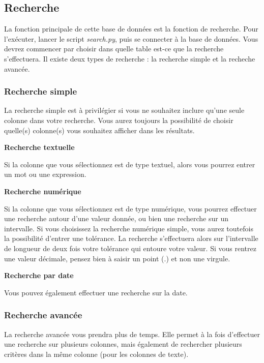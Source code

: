 \documentclass[12pt,a4paper]{article}
\begin{document}
\bigskip
\subsection{Recherche}

    La fonction principale de cette base de données est la fonction de recherche.
    Pour l'exécuter, lancer le script \emph{search.py}, puis se connecter à la base de données.
    Vous devrez commencer par choisir dans quelle table est-ce que la recherche s'effectuera.
    Il existe deux types de recherche : la recherche simple et la recheche avancée.

    \subsubsection{Recherche simple}
        La recherche simple est à privilégier si vous ne souhaitez inclure qu'une seule colonne dans votre recherche.
        Vous aurez toujours la possibilité de choisir quelle(s) colonne(s) vous souhaitez afficher dans les résultats.


        \medskip
        \textbf{Recherche textuelle}

        Si la colonne que vous sélectionnez est de type textuel, alors vous pourrez entrer un mot ou une expression.
        
        \medskip
        \textbf{Recherche numérique}
        
        Si la colonne que vous sélectionnez est de type numérique, vous pourrez effectuer une recherche autour d'une valeur donnée,
        ou bien une recherche sur un intervalle. Si vous choisissez la recherche numérique simple, vous aurez toutefois
        la possibilité d'entrer une tolérance. La recherche s'effectuera alors sur l'intervalle de longueur de deux fois votre tolérance
        qui entoure votre valeur.
        Si vous rentrez une valeur décimale, pensez bien à saisir un point (.) et non une virgule.

        \medskip
        \textbf{Recherche par date}
        
        Vous pouvez également effectuer une recherche sur la date.

    \subsubsection{Recherche avancée}
        La recherche avancée vous prendra plus de temps. Elle permet à la fois d'effectuer une recherche sur plusieurs colonnes,
        mais également de rechercher plusieurs critères dans la même colonne (pour les colonnes de texte).
\end{document}
